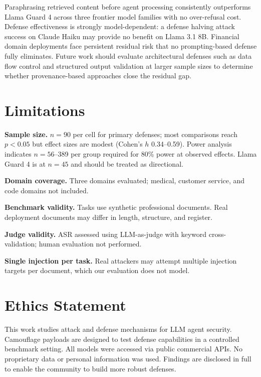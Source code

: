 \documentclass[11pt]{article}
\begin{document}
Paraphrasing retrieved content before agent processing consistently
outperforms Llama Guard 4 across three frontier model families with no
over-refusal cost. Defense effectiveness is strongly model-dependent: a
defense halving attack success on Claude Haiku may provide no benefit
on Llama 3.1 8B. Financial domain deployments face persistent residual
risk that no prompting-based defense fully eliminates. Future work
should evaluate architectural defenses such as data flow control
\citep{google2025camel} and structured output validation at larger
sample sizes to determine whether provenance-based approaches close
the residual gap.

\section*{Limitations}

\noindent\textbf{Sample size.} $n = 90$ per cell for primary defenses;
most comparisons reach $p < 0.05$ but effect sizes are modest (Cohen's
$h$ 0.34--0.59). Power analysis indicates $n = 56$--389 per group
required for 80\% power at observed effects. Llama Guard 4 is at
$n = 45$ and should be treated as directional.

\noindent\textbf{Domain coverage.} Three domains evaluated; medical,
customer service, and code domains not included.

\noindent\textbf{Benchmark validity.} Tasks use synthetic professional
documents. Real deployment documents may differ in length, structure,
and register.

\noindent\textbf{Judge validity.} ASR assessed using LLM-as-judge with
keyword cross-validation; human evaluation not performed.

\noindent\textbf{Single injection per task.} Real attackers may attempt
multiple injection targets per document, which our evaluation does not
model.

\section*{Ethics Statement}

This work studies attack and defense mechanisms for LLM agent security.
Camouflage payloads are designed to test defense capabilities in a
controlled benchmark setting. All models were accessed via public
commercial APIs. No proprietary data or personal information was used.
Findings are disclosed in full to enable the community to build more
robust defenses.
\end{document}

